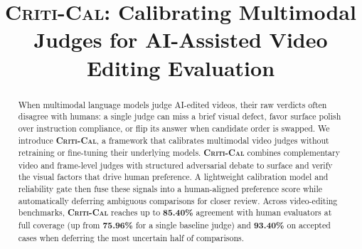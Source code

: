 \documentclass[sigconf, nonacm]{acmart}
\newcommand{\critical}{\textsc{Criti-Cal}\xspace}
\begin{document}
\title{\critical: Calibrating Multimodal Judges for AI-Assisted Video Editing Evaluation}

\begin{abstract}
When multimodal language models judge AI-edited videos, their raw verdicts often disagree with humans: a single judge can miss a brief visual defect, favor surface polish over instruction compliance, or flip its answer when candidate order is swapped. We introduce \textbf{\critical}, a framework that calibrates multimodal video judges without retraining or fine-tuning their underlying models. \textbf{\critical} combines complementary video and frame-level judges with structured adversarial debate to surface and verify the visual factors that drive human preference. A lightweight calibration model and reliability gate then fuse these signals into a human-aligned preference score while automatically deferring ambiguous comparisons for closer review. Across video-editing benchmarks, \textbf{\critical} reaches up to \textbf{85.40\%} agreement with human evaluators at full coverage (up from \textbf{75.96\%} for a single baseline judge) and \textbf{93.40\%} on accepted cases when deferring the most uncertain half of comparisons.
\end{abstract}

\maketitle









\end{document}
